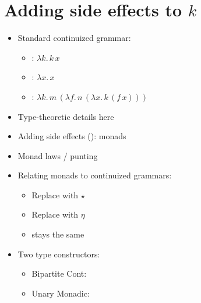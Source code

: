 \section{Adding side effects to $k$}
\begin{itemize}
	\item Standard continuized grammar:
	\begin{itemize}
		\item {}: $\lambda k.\,k\,x$
		\item {}: $\lambda x.\,x$
		\item {}: $\lambda k.\,m\,(\lambda f.\,n\,(\lambda x.\,k\,(f\,x)))$%
	\end{itemize}

	\item Type-theoretic details here
	
	\item Adding side effects (\citealt{Wadler:1994, Wadler:1995, Shan:2002}): monads%
	
	\item Monad laws / punting
	
	\item Relating monads to continuized grammars:
	\begin{itemize}
		\item Replace  with $\star$
		\item Replace  with $\eta$
		\item {} stays the same
	\end{itemize}

	\item Two type constructors:
	\begin{itemize}
		\item Bipartite Cont: 
		\item Unary Monadic: 
	\end{itemize}
	
\end{itemize}

